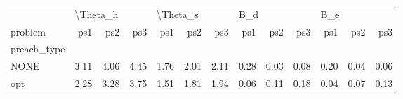 \begin{tabular}{lrrrrrrrrrrrr}
\toprule
{} & \multicolumn{3}{l}{\textbackslash Theta\_h} & \multicolumn{3}{l}{\textbackslash Theta\_s} & \multicolumn{3}{l}{B\_d} & \multicolumn{3}{l}{B\_e} \\
problem &      ps1 &  ps2 &  ps3 &      ps1 &  ps2 &  ps3 &  ps1 &  ps2 &  ps3 &  ps1 &  ps2 &  ps3 \\
preach\_type &          &      &      &          &      &      &      &      &      &      &      &      \\
\midrule
NONE        &     3.11 & 4.06 & 4.45 &     1.76 & 2.01 & 2.11 & 0.28 & 0.03 & 0.08 & 0.20 & 0.04 & 0.06 \\
opt         &     2.28 & 3.28 & 3.75 &     1.51 & 1.81 & 1.94 & 0.06 & 0.11 & 0.18 & 0.04 & 0.07 & 0.13 \\
\bottomrule
\end{tabular}
